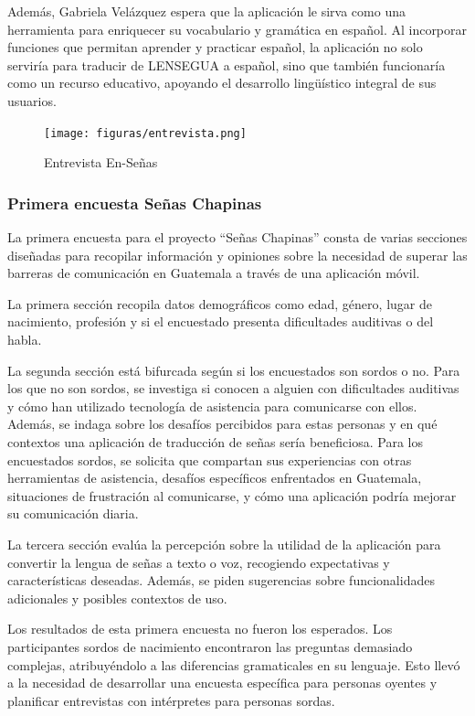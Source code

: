 Además, Gabriela Velázquez espera que la aplicación le sirva como una herramienta para enriquecer su vocabulario y gramática en español. Al incorporar funciones que permitan aprender y practicar español, la aplicación no solo serviría para traducir de LENSEGUA a español, sino que también funcionaría como un recurso educativo, apoyando el desarrollo lingüístico integral de sus usuarios.


\begin{figure} [H]
    \centering
    \texttt{[image: figuras/entrevista.png]}
    \caption{Entrevista En-Señas}
    \label{fig:enter-label}
\end{figure}

\subsubsection{Primera encuesta Señas Chapinas}

La primera encuesta para el proyecto ``Señas Chapinas'' consta de varias secciones diseñadas para recopilar información y opiniones sobre la necesidad de superar las barreras de comunicación en Guatemala a través de una aplicación móvil.

La primera sección recopila datos demográficos como edad, género, lugar de nacimiento, profesión y si el encuestado presenta dificultades auditivas o del habla.

La segunda sección está bifurcada según si los encuestados son sordos o no. Para los que no son sordos, se investiga si conocen a alguien con dificultades auditivas y cómo han utilizado tecnología de asistencia para comunicarse con ellos. Además, se indaga sobre los desafíos percibidos para estas personas y en qué contextos una aplicación de traducción de señas sería beneficiosa. Para los encuestados sordos, se solicita que compartan sus experiencias con otras herramientas de asistencia, desafíos específicos enfrentados en Guatemala, situaciones de frustración al comunicarse, y cómo una aplicación podría mejorar su comunicación diaria.

La tercera sección evalúa la percepción sobre la utilidad de la aplicación para convertir la lengua de señas a texto o voz, recogiendo expectativas y características deseadas. Además, se piden sugerencias sobre funcionalidades adicionales y posibles contextos de uso.

Los resultados de esta primera encuesta no fueron los esperados. Los participantes sordos de nacimiento encontraron las preguntas demasiado complejas, atribuyéndolo a las diferencias gramaticales en su lenguaje. Esto llevó a la necesidad de desarrollar una encuesta específica para personas oyentes y planificar entrevistas con intérpretes para personas sordas.


